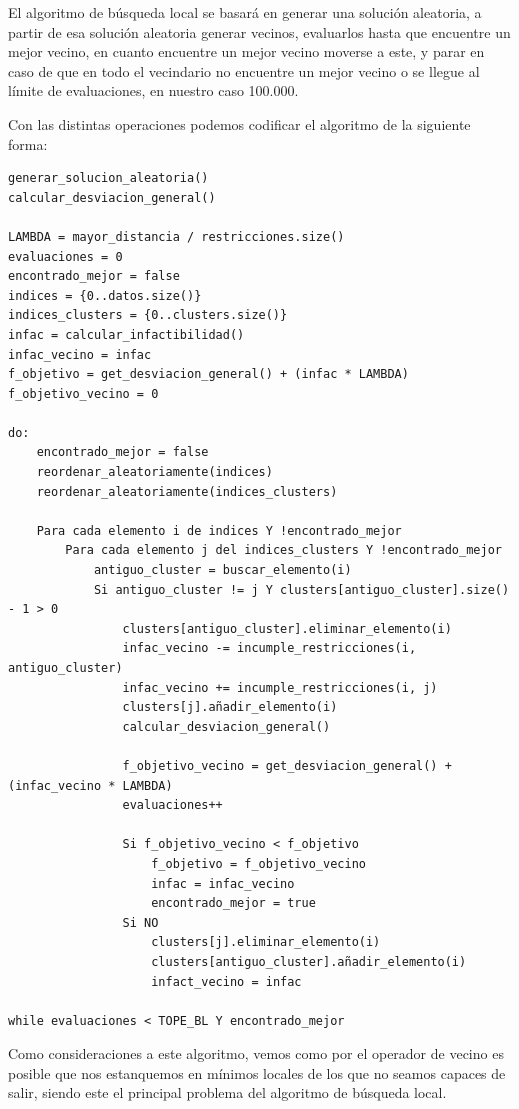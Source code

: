 \documentclass[12pt, spanish]{article}
\begin{document}
El algoritmo de búsqueda local se basará en generar una solución aleatoria, a partir de esa solución aleatoria generar vecinos, evaluarlos hasta que encuentre un mejor vecino, en cuanto encuentre un mejor vecino moverse a este, y parar en caso de que en todo el vecindario no encuentre un mejor vecino o se llegue al límite de evaluaciones, en nuestro caso 100.000.

\newpage

Con las distintas operaciones podemos codificar el algoritmo de la siguiente forma:

{\small
\begin{lstlisting}
generar_solucion_aleatoria()
calcular_desviacion_general()

LAMBDA = mayor_distancia / restricciones.size()
evaluaciones = 0
encontrado_mejor = false
indices = {0..datos.size()}
indices_clusters = {0..clusters.size()}
infac = calcular_infactibilidad()
infac_vecino = infac
f_objetivo = get_desviacion_general() + (infac * LAMBDA)
f_objetivo_vecino = 0

do:
	encontrado_mejor = false
	reordenar_aleatoriamente(indices)
	reordenar_aleatoriamente(indices_clusters)
	
	Para cada elemento i de indices Y !encontrado_mejor
		Para cada elemento j del indices_clusters Y !encontrado_mejor
			antiguo_cluster = buscar_elemento(i)
			Si antiguo_cluster != j Y clusters[antiguo_cluster].size() - 1 > 0
				clusters[antiguo_cluster].eliminar_elemento(i)
				infac_vecino -= incumple_restricciones(i, antiguo_cluster)
				infac_vecino += incumple_restricciones(i, j)
				clusters[j].añadir_elemento(i)
				calcular_desviacion_general()
				
				f_objetivo_vecino = get_desviacion_general() + (infac_vecino * LAMBDA)
				evaluaciones++				
				
				Si f_objetivo_vecino < f_objetivo
					f_objetivo = f_objetivo_vecino
					infac = infac_vecino
					encontrado_mejor = true
				Si NO
					clusters[j].eliminar_elemento(i)
					clusters[antiguo_cluster].añadir_elemento(i)
					infact_vecino = infac

while evaluaciones < TOPE_BL Y encontrado_mejor
 \end{lstlisting}
 }
 
 
Como consideraciones a este algoritmo, vemos como por el operador de vecino es posible que nos estanquemos en mínimos locales de los que no seamos capaces de salir, siendo este el principal problema del algoritmo de búsqueda local.
\end{document}

